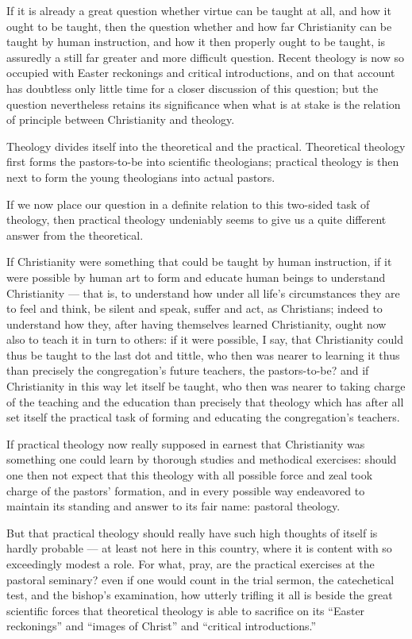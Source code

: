 \documentclass[12pt,a4paper]{book}
\begin{document}
If it is already a great question whether virtue can be taught at all, and how it ought to be
taught, then the question whether and how far Christianity can be taught by human instruction,
and how it then properly ought to be taught, is assuredly a still far greater and more difficult
question. Recent theology is now so occupied with Easter reckonings and critical introductions,
and on that account has doubtless only little time for a closer discussion of this question; but
the question nevertheless retains its significance when what is at stake is the relation of
principle between Christianity and theology.

Theology divides itself into the theoretical and the practical. Theoretical theology first forms
the pastors-to-be into scientific theologians; practical theology is then next to form the young
theologians into actual pastors.

If we now place our question in a definite relation to this two-sided task of theology, then
practical theology undeniably seems to give us a quite different answer from the theoretical.

If Christianity were something that could be taught by human instruction, if it were possible by
human art to form and educate human beings to understand Christianity --- that is, to understand
how under all life's circumstances they are to feel and think, be silent and speak, suffer and
act, as Christians; indeed to understand how they, after having themselves learned Christianity,
ought now also to teach it in turn to others: if it were possible, I say, that Christianity could
thus be taught to the last dot and tittle, who then was nearer to learning it thus than precisely
the congregation's future teachers, the pastors-to-be? and if Christianity in this way let itself
be taught, who then was nearer to taking charge of the teaching and the education than precisely
that theology which has after all set itself the practical task of forming and educating the
congregation's teachers.

If practical theology now really supposed in earnest that Christianity was something one could
learn by thorough studies and methodical exercises: should one then not expect that this theology
with all possible force and zeal took charge of the pastors' formation, and in every possible way
endeavored to maintain its standing and answer to its fair name: pastoral theology.

But that practical theology should really have such high thoughts of itself is hardly probable
--- at least not here in this country, where it is content with so exceedingly modest a role. For
what, pray, are the practical exercises at the pastoral seminary? even
if one would count in the trial sermon, the catechetical test, and the bishop's examination, how
utterly trifling it all is beside the great scientific forces that theoretical theology is able
to sacrifice on its ``Easter reckonings'' and ``images of Christ'' and ``critical introductions.''
\end{document}
